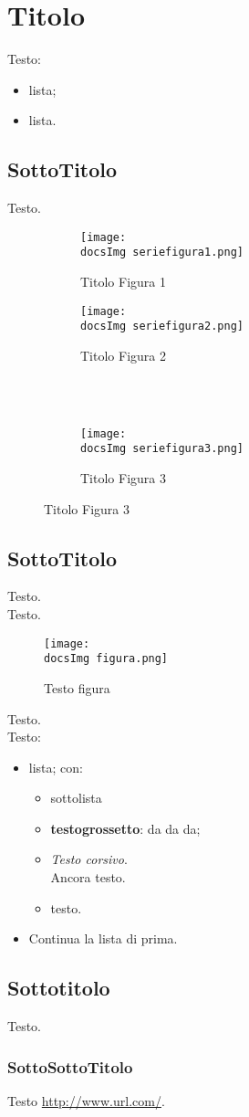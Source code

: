 \section{Titolo}{
	Testo:
	\begin{itemize}\itemsep1pt
		\item lista;
		\item lista.
	\end{itemize} 
	
	\subsection{SottoTitolo}{
		Testo.
		
		\begin{figure}[ht]
			\begin{subfigure}[b]{0.5\textwidth}
				\texttt{[image: \\docsImg seriefigura1.png]}
				\caption{Titolo Figura 1}
				\label{Titolo Figura 1}
			\end{subfigure}
			\begin{subfigure}[b]{0.5\textwidth}
				\texttt{[image: \\docsImg seriefigura2.png]}
				\caption{Titolo Figura 2}
				\label{Titolo Figura 2}
			\end{subfigure}
			\\
			\\
			\begin{subfigure}[b]{0.5\textwidth}
				\texttt{[image: \\docsImg seriefigura3.png]}
				\caption{Titolo Figura 3}
				\label{Titolo Figura 3}
			\end{subfigure}
		\end{figure}
	}
	\subsection{SottoTitolo}{
		Testo.
	\\
		Testo.
		\begin{figure}[ht]
			\centering
			\texttt{[image: \\docsImg figura.png]}
			\caption{Testo figura}
			\label{Testo figura}
		\end{figure}
		
		Testo.
		\\
		Testo:
		\begin{itemize}\itemsep1pt
			\item lista; con:
			\begin{itemize}\itemsep1pt
				\item sottolista
				\item \textbf{testogrossetto}: da da da;
				\item \textit{Testo corsivo}.\\ 
				Ancora testo.
				\item testo.
			\end{itemize}
			\item Continua la lista di prima.
		\end{itemize}
		}
	\subsection{Sottotitolo}{
		Testo.
		\subsubsection{SottoSottoTitolo}{
			Testo \url{http://www.url.com/}.
		}
	}
}
